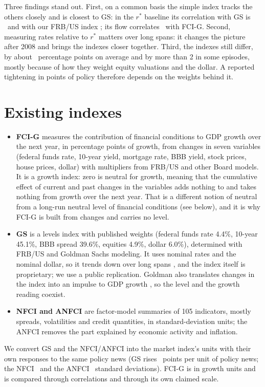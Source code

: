 \documentclass[11pt]{article}
\begin{document}
Three findings stand out. First, on a common basis the simple index tracks the others closely and is closest to GS: in the $r^*$ baseline its correlation with GS is \RstarMktGs\ and with our FRB/US index \RstarMktFrbus; its flow correlates \RstarFiFcig\ with FCI-G. Second, measuring rates relative to $r^*$ matters over long spans: it changes the picture after 2008 and brings the indexes closer together. Third, the indexes still differ, by about \RstarRangeLong\ percentage points on average and by more than 2 in some episodes, mostly because of how they weight equity valuations and the dollar. A reported tightening in points of policy therefore depends on the weights behind it.

\section{Existing indexes}

\begin{itemize}
\item \textbf{FCI-G} \citep{ajello2023} measures the contribution of financial conditions to GDP growth over the next year, in percentage points of growth, from changes in seven variables (federal funds rate, 10-year yield, mortgage rate, BBB yield, stock prices, house prices, dollar) with multipliers from FRB/US and other Board models. It is a growth index: zero is neutral for growth, meaning that the cumulative effect of current and past changes in the variables adds nothing to and takes nothing from growth over the next year. That is a different notion of neutral from a long-run neutral level of financial conditions (see below), and it is why FCI-G is built from changes and carries no level.
\item \textbf{GS} \citep{dudley2000,hatzius2010,hatzius2018,hatzius2019} is a levels index with published weights (federal funds rate 4.4\%, 10-year 45.1\%, BBB spread 39.6\%, equities 4.9\%, dollar 6.0\%), determined with FRB/US and Goldman Sachs modeling. It uses nominal rates and the nominal dollar, so it trends down over long spans \citep{hatzius2010}, and the index itself is proprietary; we use a public replication. Goldman also translates changes in the index into an impulse to GDP growth \citep{hatzius2019}, so the level and the growth reading coexist.
\item \textbf{NFCI and ANFCI} \citep{brave2011} are factor-model summaries of 105 indicators, mostly spreads, volatilities and credit quantities, in standard-deviation units; the ANFCI removes the part explained by economic activity and inflation.
\end{itemize}
We convert GS and the NFCI/ANFCI into the market index's units with their own responses to the same policy news (GS rises \GSResp\ points per unit of policy news; the NFCI \NFCIResp\ and the ANFCI \ANFCIResp\ standard deviations). FCI-G is in growth units and is compared through correlations and through its own claimed scale.
\end{document}
